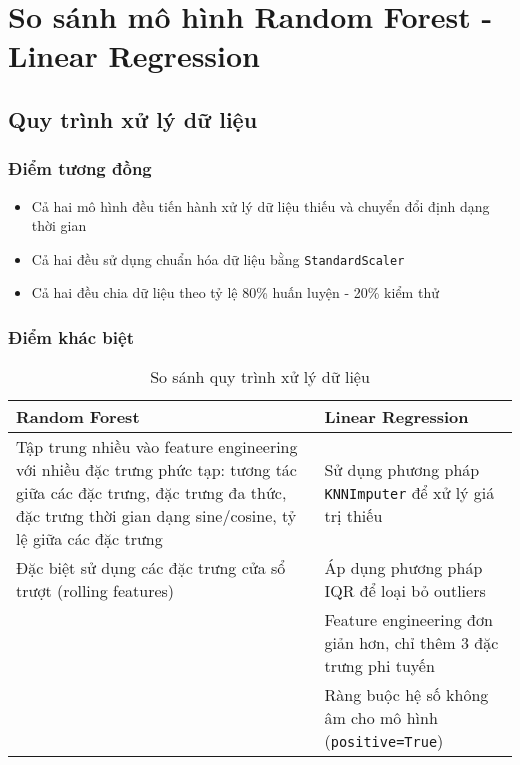

\section{So sánh mô hình Random Forest - Linear Regression}

\subsection{Quy trình xử lý dữ liệu}

\subsubsection{Điểm tương đồng}
\begin{itemize}
  \item Cả hai mô hình đều tiến hành xử lý dữ liệu thiếu và chuyển đổi định dạng thời gian
  \item Cả hai đều sử dụng chuẩn hóa dữ liệu bằng \texttt{StandardScaler}
  \item Cả hai đều chia dữ liệu theo tỷ lệ 80\% huấn luyện - 20\% kiểm thử
\end{itemize}

\subsubsection{Điểm khác biệt}

\begin{table}[H]
\centering
\caption{So sánh quy trình xử lý dữ liệu}
\begin{tabular}{p{7cm}|p{7cm}}
\toprule
\textbf{Random Forest} & \textbf{Linear Regression} \\
\midrule
Tập trung nhiều vào feature engineering với nhiều đặc trưng phức tạp: tương tác giữa các đặc trưng, đặc trưng đa thức, đặc trưng thời gian dạng sine/cosine, tỷ lệ giữa các đặc trưng & Sử dụng phương pháp \texttt{KNNImputer} để xử lý giá trị thiếu \\
\midrule
Đặc biệt sử dụng các đặc trưng cửa sổ trượt (rolling features) & Áp dụng phương pháp IQR để loại bỏ outliers \\
\midrule
 & Feature engineering đơn giản hơn, chỉ thêm 3 đặc trưng phi tuyến \\
\midrule
 & Ràng buộc hệ số không âm cho mô hình (\texttt{positive=True}) \\
\bottomrule
\end{tabular}
\end{table}

